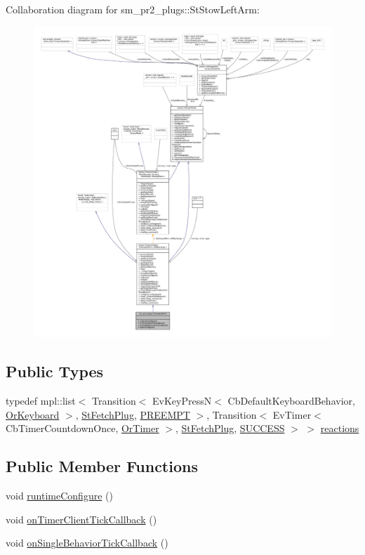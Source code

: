 Collaboration diagram for sm\+\_\+pr2\+\_\+plugs\+:\+:St\+Stow\+Left\+Arm\+:
\nopagebreak
\begin{figure}[H]
\begin{center}
\leavevmode
\includegraphics[width=350pt]{structsm__pr2__plugs_1_1StStowLeftArm__coll__graph}
\end{center}
\end{figure}
\subsection*{Public Types}
\begin{DoxyCompactItemize}
\item 
typedef mpl\+::list$<$ Transition$<$ Ev\+Key\+PressN$<$ Cb\+Default\+Keyboard\+Behavior, \hyperlink{classsm__pr2__plugs_1_1OrKeyboard}{Or\+Keyboard} $>$, \hyperlink{structsm__pr2__plugs_1_1StFetchPlug}{St\+Fetch\+Plug}, \hyperlink{classPREEMPT}{P\+R\+E\+E\+M\+PT} $>$, Transition$<$ Ev\+Timer$<$ Cb\+Timer\+Countdown\+Once, \hyperlink{classsm__pr2__plugs_1_1OrTimer}{Or\+Timer} $>$, \hyperlink{structsm__pr2__plugs_1_1StFetchPlug}{St\+Fetch\+Plug}, \hyperlink{classSUCCESS}{S\+U\+C\+C\+E\+SS} $>$ $>$ \hyperlink{structsm__pr2__plugs_1_1StStowLeftArm_a87f889e0a7e42c40fabfc6d4af5256f0}{reactions}
\end{DoxyCompactItemize}
\subsection*{Public Member Functions}
\begin{DoxyCompactItemize}
\item 
void \hyperlink{structsm__pr2__plugs_1_1StStowLeftArm_af3124c3f8bc9a03f7af8c49dd0469856}{runtime\+Configure} ()
\item 
void \hyperlink{structsm__pr2__plugs_1_1StStowLeftArm_a9a93ba44d99b53a4800aeae059ea5bc4}{on\+Timer\+Client\+Tick\+Callback} ()
\item 
void \hyperlink{structsm__pr2__plugs_1_1StStowLeftArm_ac59caffbdba0918475f0778081742b40}{on\+Single\+Behavior\+Tick\+Callback} ()
\end{DoxyCompactItemize}
